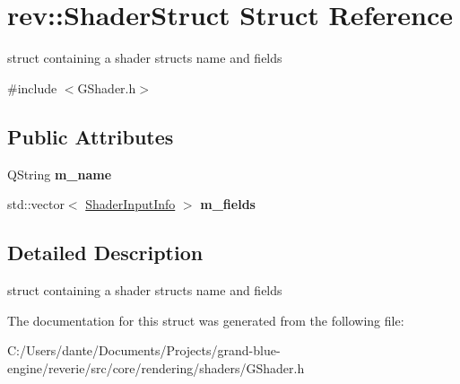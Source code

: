 \hypertarget{structrev_1_1_shader_struct}{}\section{rev\+::Shader\+Struct Struct Reference}
\label{structrev_1_1_shader_struct}


struct containing a shader struct\textquotesingle{}s name and fields  




{\ttfamily \#include $<$G\+Shader.\+h$>$}

\subsection*{Public Attributes}
\begin{DoxyCompactItemize}
\item 
\mbox{\label{structrev_1_1_shader_struct_a0102621a46550c8690b9b2dd0f1e3058}} 
Q\+String {\bfseries m\+\_\+name}
\item 
\mbox{\label{structrev_1_1_shader_struct_a2fcd6cc26d53e0f4c355f5dac537435e}} 
std\+::vector$<$ \mbox{\hyperlink{structrev_1_1_shader_input_info}{Shader\+Input\+Info}} $>$ {\bfseries m\+\_\+fields}
\end{DoxyCompactItemize}


\subsection{Detailed Description}
struct containing a shader struct\textquotesingle{}s name and fields 

The documentation for this struct was generated from the following file\+:\begin{DoxyCompactItemize}
\item 
C\+:/\+Users/dante/\+Documents/\+Projects/grand-\/blue-\/engine/reverie/src/core/rendering/shaders/G\+Shader.\+h\end{DoxyCompactItemize}
